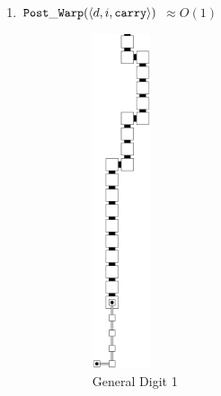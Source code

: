 \begin{enumerate}[label={--}]
            \item ${\tt Post\_Warp}  (\langle d, i, {\tt carry}\rangle)$ $\approx O(1)$
                \begin{figure}[H]
                    \begin{subfigure}[t]{0.2\textwidth}
                        \centering
                        \includegraphics[width=0.2\textwidth]{warping/post_warp_general_digit1}
                        \caption{\label{fig:warping/post_warp_general_digit1} General Digit 1}
                    \end{subfigure}%
                    ~
                    \begin{subfigure}[t]{0.2\textwidth}
                        \centering

\end{subfigure}
\end{figure}
\end{enumerate}
